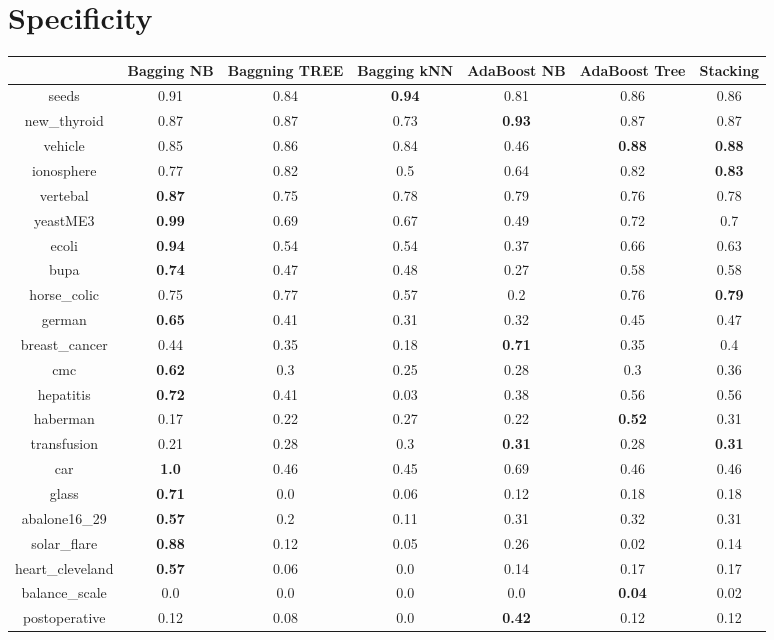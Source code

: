 \documentclass{article}%
\begin{document}
\section*{Specificity}%
\begin{tabular}{c|cccccc}%
&Bagging NB&Baggning TREE&Bagging kNN&AdaBoost NB&AdaBoost Tree&Stacking\\%
\hline%
seeds&0.91&0.84&\textbf{0.94}&0.81&0.86&0.86\\%
new\_thyroid&0.87&0.87&0.73&\textbf{0.93}&0.87&0.87\\%
vehicle&0.85&0.86&0.84&0.46&\textbf{0.88}&\textbf{0.88}\\%
ionosphere&0.77&0.82&0.5&0.64&0.82&\textbf{0.83}\\%
vertebal&\textbf{0.87}&0.75&0.78&0.79&0.76&0.78\\%
yeastME3&\textbf{0.99}&0.69&0.67&0.49&0.72&0.7\\%
ecoli&\textbf{0.94}&0.54&0.54&0.37&0.66&0.63\\%
bupa&\textbf{0.74}&0.47&0.48&0.27&0.58&0.58\\%
horse\_colic&0.75&0.77&0.57&0.2&0.76&\textbf{0.79}\\%
german&\textbf{0.65}&0.41&0.31&0.32&0.45&0.47\\%
breast\_cancer&0.44&0.35&0.18&\textbf{0.71}&0.35&0.4\\%
cmc&\textbf{0.62}&0.3&0.25&0.28&0.3&0.36\\%
hepatitis&\textbf{0.72}&0.41&0.03&0.38&0.56&0.56\\%
haberman&0.17&0.22&0.27&0.22&\textbf{0.52}&0.31\\%
transfusion&0.21&0.28&0.3&\textbf{0.31}&0.28&\textbf{0.31}\\%
car&\textbf{1.0}&0.46&0.45&0.69&0.46&0.46\\%
glass&\textbf{0.71}&0.0&0.06&0.12&0.18&0.18\\%
abalone16\_29&\textbf{0.57}&0.2&0.11&0.31&0.32&0.31\\%
solar\_flare&\textbf{0.88}&0.12&0.05&0.26&0.02&0.14\\%
heart\_cleveland&\textbf{0.57}&0.06&0.0&0.14&0.17&0.17\\%
balance\_scale&0.0&0.0&0.0&0.0&\textbf{0.04}&0.02\\%
postoperative&0.12&0.08&0.0&\textbf{0.42}&0.12&0.12\\%
\end{tabular}

%
\end{document}

